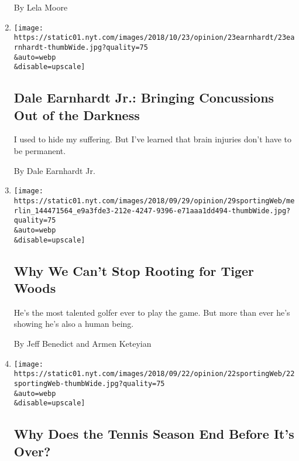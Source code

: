 \begin{enumerate}
  By Lela Moore
\item
  \href{/2018/10/23/opinion/health/dale-earnhardt-jr-concussion-nascar-retirement.html}{}

  \texttt{[image: https://static01.nyt.com/images/2018/10/23/opinion/23earnhardt/23earnhardt-thumbWide.jpg?quality=75\\\&auto=webp\\\&disable=upscale]}

  \hypertarget{dale-earnhardt-jr-bringing-concussions-out-of-the-darkness}{%
  \subsection{Dale Earnhardt Jr.: Bringing Concussions Out of the
  Darkness}\label{dale-earnhardt-jr-bringing-concussions-out-of-the-darkness}}

  I used to hide my suffering. But I've learned that brain injuries
  don't have to be permanent.

  By Dale Earnhardt Jr.
\item
  \href{/2018/09/29/opinion/tiger-woods-ryder-cup-golf.html}{}

  \texttt{[image: https://static01.nyt.com/images/2018/09/29/opinion/29sportingWeb/merlin\_144471564\_e9a3fde3-212e-4247-9396-e71aaa1dd494-thumbWide.jpg?quality=75\\\&auto=webp\\\&disable=upscale]}

  \hypertarget{why-we-cant-stop-rooting-for-tiger-woods}{%
  \subsection{Why We Can't Stop Rooting for Tiger
  Woods}\label{why-we-cant-stop-rooting-for-tiger-woods}}

  He's the most talented golfer ever to play the game. But more than
  ever he's showing he's also a human being.

  By Jeff Benedict and Armen Keteyian
\item
  \href{/2018/09/22/opinion/laver-cup-federer-djokovic-tennis.html}{}

  \texttt{[image: https://static01.nyt.com/images/2018/09/22/opinion/22sportingWeb/22sportingWeb-thumbWide.jpg?quality=75\\\&auto=webp\\\&disable=upscale]}

  \hypertarget{why-does-the-tennis-season-end-before-its-over}{%
  \subsection{Why Does the Tennis Season End Before It's
  Over?}\label{why-does-the-tennis-season-end-before-its-over}}


\end{enumerate}
